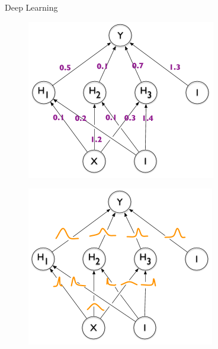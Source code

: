 \documentclass{beamer}
\begin{document}
\begin{frame}{Deep Learning}
		\begin{figure}
			\includegraphics[width=1\columnwidth]{pres_pics/BNN_1}
		\end{figure}
		\begin{figure}
			\includegraphics[width=1\columnwidth]{pres_pics/BNN_2}
		\end{figure}
	
\end{frame}
\end{document}
